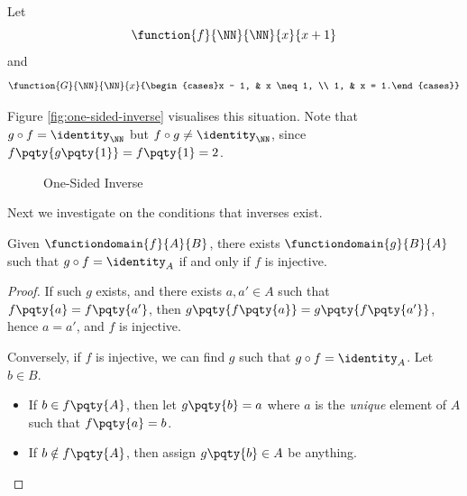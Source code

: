 \begin{example}
    Let
    \[
        \function{f}{\NN}{\NN}{x}{x + 1}
    \]
    and
    \[
        \function{G}{\NN}{\NN}{x}{\begin{cases}x - 1, & x \neq 1, \\ 1, & x = 1.\end{cases}}
    \]

    Figure \autoref{fig:one-sided-inverse} visualises this situation. Note that \(g \circ f = \identity_{\NN}\) but \(f \circ g \neq \identity_{\NN}\), since \(f \pqty{g\pqty{1}} = f\pqty{1} = 2\).
\end{example}

\begin{figure}[ht!]
    \centering
    \caption{One-Sided Inverse}
    \label{fig:one-sided-inverse}
\end{figure}

Next we investigate on the conditions that inverses exist.

\begin{lemma}
    Given \(\functiondomain{f}{A}{B}\), there exists \(\functiondomain{g}{B}{A}\) such that \(g \circ f = \identity_A\) if and only if \(f\) is injective.
\end{lemma}

\begin{proof}
    If such \(g\) exists, and there exists \(a, a' \in A\) such that \(f \pqty{a} = f \pqty{a'}\), then \(g \pqty{f \pqty{a}} = g \pqty{f \pqty{a'}}\), hence \(a = a'\), and \(f\) is injective.

    Conversely, if \(f\) is injective, we can find \(g\) such that \(g \circ f = \identity_A\). Let \(b \in B\).
    \begin{itemize}
        \item If \(b \in f\pqty{A}\), then let \(g \pqty{b} = a\) where \(a\) is the \emph{unique} element of \(A\) such that \(f\pqty{a} = b\).
        \item If \(b \notin f\pqty{A}\), then assign \(g \pqty{b} \in A\) be anything.
    \end{itemize}
\end{proof}

